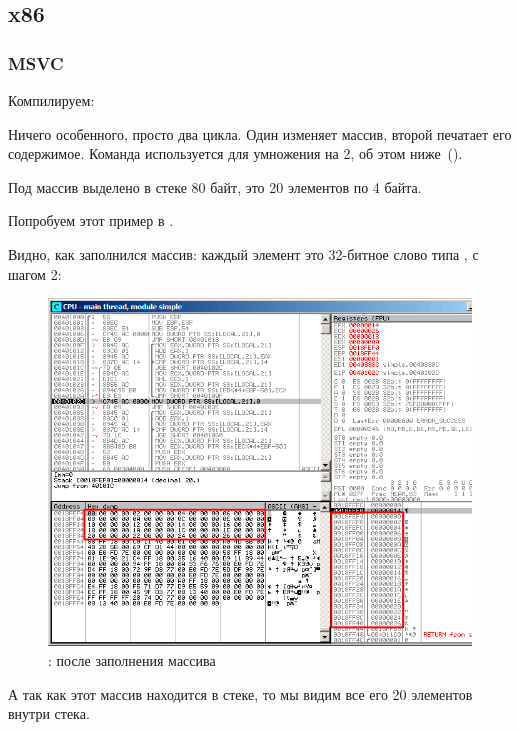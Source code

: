 \subsection{x86}

\subsubsection{MSVC}

Компилируем:



Ничего особенного, просто два цикла. Один изменяет массив, второй печатает его содержимое. 
Команда  используется для умножения \ECX на 2, об этом ниже~().

Под массив выделено в стеке 80 байт, это 20 элементов по 4 байта.

\clearpage
Попробуем этот пример в \olly.
\myindex{\olly}

Видно, как заполнился массив: каждый элемент это 32-битное слово типа \Tint, с шагом 2:

\begin{figure}[H]
\centering
\includegraphics[scale=\FigScale]{patterns/13_arrays/1_simple/olly.png}
\caption{\olly: после заполнения массива}
\label{fig:array_simple_olly}
\end{figure}

А так как этот массив находится в стеке, то мы видим все его 20 элементов внутри стека.

